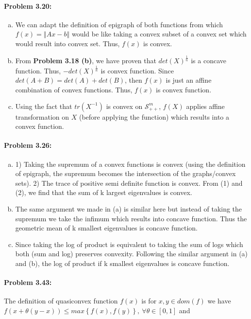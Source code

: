 \documentclass[12pt] {article}
\begin{document}
\paragraph{Problem 3.20:} 
\begin{enumerate}[(a)]
\item We can adapt the definition of epigraph of both functions from which $f(x) = \left\Vert Ax -b \right\Vert$ would be like taking a convex subset of a convex set which would result into convex set. Thus, $f(x)$ is convex. 
\item From \textbf{Problem 3.18 (b)}, we have proven that $det(X)^{\frac{1}{n}}$ is a concave function. Thus, $-det(X)^{\frac{1}{n}}$ is convex function. Since $det(A+B) = det(A) + det(B)$, then $f(x)$ is just an affine combination of convex functions. Thus, $f(x)$ is convex function. 
\item Using the fact that $tr(X^{-1})$ is convex on $\mathcal{S}^{m}_{++}$, $f(X)$ applies affine transformation on $X$ (before applying the function) which results into a convex function. 
\end{enumerate}

\paragraph{Problem 3.26:} 
\begin{enumerate} [(a)]
\item 1) Taking the supremum of a convex functions is convex (using the definition of epigraph, the supremum becomes the intersection of the graphs/convex sets). 2) The trace of positive semi definite function is convex. From (1) and (2), we find that the sum of k largest eigenvalues is convex. 

\item The same argument we made in (a) is similar here but instead of taking the supremum we take the infimum which results into concave function. Thus the geometric mean of k smallest eigenvalues is concave function. 

\item Since taking the log of product is equivalent to taking the sum of logs which both (sum and log) preserves convexity. Following the similar argument in (a) and (b), the log of product if k smallest eigenvalues is concave function. 


\end{enumerate}
\paragraph{Problem 3.43:} 
The definition of quasiconvex function $f(x)$ is for $x,y \in dom(f)$ we have $f(x+\theta (y-x)) \leq max \left\lbrace  f(x), f(y) \right\rbrace ,\ \forall \theta \in [0,1]$ and
\end{document}
